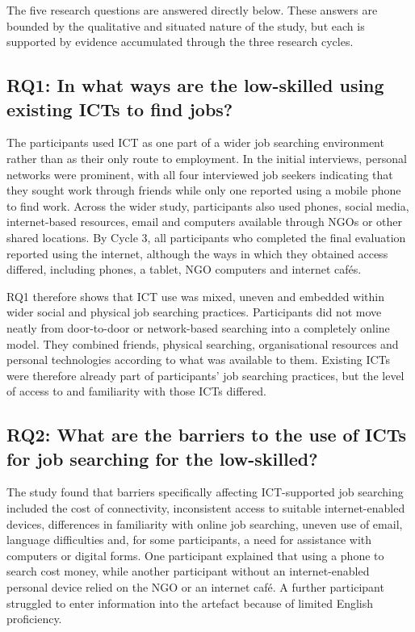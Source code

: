 The five research questions are answered directly below. These answers are bounded by the qualitative and situated nature of the study, but each is supported by evidence accumulated through the three research cycles.


\subsection{RQ1: In what ways are the low-skilled using existing ICTs to find jobs?}

The participants used ICT as one part of a wider job searching environment rather than as their only route to employment. In the initial interviews, personal networks were prominent, with all four interviewed job seekers indicating that they sought work through friends while only one reported using a mobile phone to find work. Across the wider study, participants also used phones, social media, internet-based resources, email and computers available through NGOs or other shared locations. By Cycle 3, all participants who completed the final evaluation reported using the internet, although the ways in which they obtained access differed, including phones, a tablet, NGO computers and internet cafés.

RQ1 therefore shows that ICT use was mixed, uneven and embedded within wider social and physical job searching practices. Participants did not move neatly from door-to-door or network-based searching into a completely online model. They combined friends, physical searching, organisational resources and personal technologies according to what was available to them. Existing ICTs were therefore already part of participants' job searching practices, but the level of access to and familiarity with those ICTs differed.


\subsection{RQ2: What are the barriers to the use of ICTs for job searching for the low-skilled?}

The study found that barriers specifically affecting ICT-supported job searching included the cost of connectivity, inconsistent access to suitable internet-enabled devices, differences in familiarity with online job searching, uneven use of email, language difficulties and, for some participants, a need for assistance with computers or digital forms. One participant explained that using a phone to search cost money, while another participant without an internet-enabled personal device relied on the NGO or an internet café. A further participant struggled to enter information into the artefact because of limited English proficiency.

